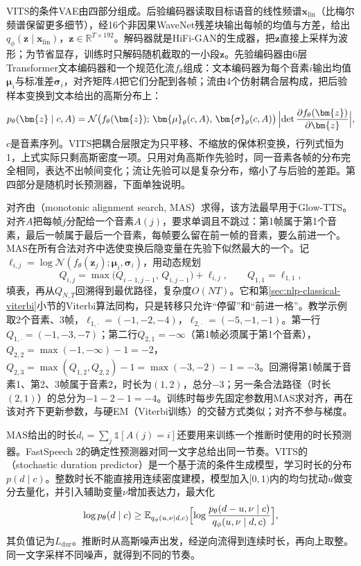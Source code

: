 VITS的条件VAE由四部分组成。后验编码器读取目标语音的线性频谱$\bm{x}_{\mathrm{lin}}$（比梅尔频谱保留更多细节），经16个非因果WaveNet残差块输出每帧的均值与方差，给出$q_\phi(\bm{z}\mid\bm{x}_{\mathrm{lin}})$，$\bm{z}\in\mathbb{R}^{T\times192}$。解码器就是HiFi-GAN的生成器，把$\bm{z}$直接上采样为波形；为节省显存，训练时只解码随机截取的一小段$\bm{z}$。先验编码器由6层Transformer文本编码器和一个规范化流$f_\theta$组成：文本编码器为每个音素$i$输出均值$\bm{\mu}_i$与标准差$\bm{\sigma}_i$，对齐矩阵$A$把它们分配到各帧；流由4个仿射耦合层构成，把后验样本变换到文本给出的高斯分布上：
\begin{equation}
  p_\theta(\bm{z}\mid c,A)=\mathcal{N}\bigl(f_\theta(\bm{z});\,\bm{\mu}_{\theta}(c,A),\,\bm{\sigma}_{\theta}(c,A)\bigr)\,\Bigl\lvert\det\frac{\partial f_\theta(\bm{z})}{\partial\bm{z}}\Bigr\rvert,
  \label{eq:nlp-speech-vits-prior}
\end{equation}
$c$是音素序列。VITS把耦合层限定为只平移、不缩放的保体积变换，行列式恒为1，上式实际只剩高斯密度一项。只用对角高斯作先验时，同一音素各帧的分布完全相同，表达不出帧间变化；流让先验可以是复杂分布，缩小了与后验的差距。第四部分是随机时长预测器，下面单独说明。

对齐由（monotonic alignment search, MAS）求得，该方法最早用于Glow-TTS\cite{nlp-speech-kim2020glowtts}。对齐$A$把每帧$j$分配给一个音素$A(j)$，要求单调且不跳过：第1帧属于第1个音素，最后一帧属于最后一个音素，每帧要么留在前一帧的音素，要么前进一个。MAS在所有合法对齐中选使变换后隐变量在先验下似然最大的一个。记$\ell_{i,j}=\log\mathcal{N}(f_\theta(\bm{z}_j);\bm{\mu}_i,\bm{\sigma}_i)$，用动态规划
\begin{equation}
  Q_{i,j}=\max\bigl(Q_{i-1,j-1},\,Q_{i,j-1}\bigr)+\ell_{i,j},
  \qquad Q_{1,1}=\ell_{1,1},
  \label{eq:nlp-speech-mas}
\end{equation}
填表，再从$Q_{N,T}$回溯得到最优路径，复杂度$O(NT)$。它和第\ref{sec:nlp-classical-viterbi}小节的Viterbi算法同构，只是转移只允许“停留”和“前进一格”。教学示例取2个音素、3帧，$\ell_{1,\cdot}=(-1,-2,-4)$，$\ell_{2,\cdot}=(-5,-1,-1)$。第一行$Q_{1,\cdot}=(-1,-3,-7)$；第二行$Q_{2,1}=-\infty$（第1帧必须属于第1个音素），$Q_{2,2}=\max(-1,-\infty)-1=-2$，$Q_{2,3}=\max(Q_{1,2},Q_{2,2})-1=\max(-3,-2)-1=-3$。回溯得第1帧属于音素1、第2、3帧属于音素2，时长为$(1,2)$，总分$-3$；另一条合法路径（时长$(2,1)$）的总分为$-1-2-1=-4$。训练时每步先固定参数用MAS求对齐，再在该对齐下更新参数，与硬EM（Viterbi训练）的交替方式类似；对齐不参与梯度。

MAS给出的时长$d_i=\sum_j\mathbb{1}[A(j)=i]$还要用来训练一个推断时使用的时长预测器。FastSpeech 2的确定性预测器对同一文字总给出同一节奏。VITS的（stochastic duration predictor）是一个基于流的条件生成模型，学习时长的分布$p(d\mid c)$。整数时长不能直接用连续密度建模，模型加入$[0,1)$内的均匀扰动$u$做变分去量化，并引入辅助变量$\nu$增加表达力，最大化
\begin{equation}
  \log p_\theta(d\mid c)\geq\mathbb{E}_{q_\phi(u,\nu\mid d,c)}\Bigl[\log\frac{p_\theta(d-u,\nu\mid c)}{q_\phi(u,\nu\mid d,c)}\Bigr],
  \label{eq:nlp-speech-vits-duration}
\end{equation}
其负值记为$L_{\mathrm{dur}}$。推断时从高斯噪声出发，经逆向流得到连续时长，再向上取整。同一文字采样不同噪声，就得到不同的节奏。

